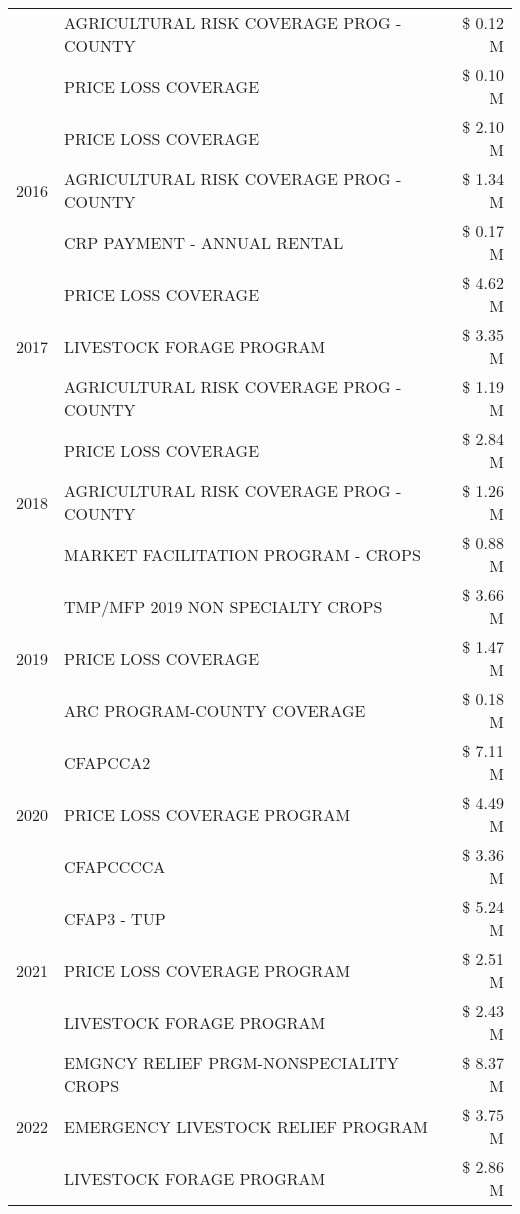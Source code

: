 \begin{tabular}{llr}
 & AGRICULTURAL RISK COVERAGE PROG - COUNTY & \$ 0.12 M \\
 & PRICE LOSS COVERAGE & \$ 0.10 M \\
\cline{1-3}
\multirow[t]{3}{*}{2016} & PRICE LOSS COVERAGE & \$ 2.10 M \\
 & AGRICULTURAL RISK COVERAGE PROG - COUNTY & \$ 1.34 M \\
 & CRP PAYMENT - ANNUAL RENTAL & \$ 0.17 M \\
\cline{1-3}
\multirow[t]{3}{*}{2017} & PRICE LOSS COVERAGE & \$ 4.62 M \\
 & LIVESTOCK FORAGE PROGRAM & \$ 3.35 M \\
 & AGRICULTURAL RISK COVERAGE PROG - COUNTY & \$ 1.19 M \\
\cline{1-3}
\multirow[t]{3}{*}{2018} & PRICE LOSS COVERAGE & \$ 2.84 M \\
 & AGRICULTURAL RISK COVERAGE PROG - COUNTY & \$ 1.26 M \\
 & MARKET FACILITATION PROGRAM - CROPS & \$ 0.88 M \\
\cline{1-3}
\multirow[t]{3}{*}{2019} & TMP/MFP 2019 NON SPECIALTY CROPS & \$ 3.66 M \\
 & PRICE LOSS COVERAGE & \$ 1.47 M \\
 & ARC PROGRAM-COUNTY COVERAGE & \$ 0.18 M \\
\cline{1-3}
\multirow[t]{3}{*}{2020} & CFAPCCA2 & \$ 7.11 M \\
 & PRICE LOSS COVERAGE PROGRAM & \$ 4.49 M \\
 & CFAPCCCCA & \$ 3.36 M \\
\cline{1-3}
\multirow[t]{3}{*}{2021} & CFAP3 - TUP & \$ 5.24 M \\
 & PRICE LOSS COVERAGE PROGRAM & \$ 2.51 M \\
 & LIVESTOCK FORAGE PROGRAM & \$ 2.43 M \\
\cline{1-3}
\multirow[t]{3}{*}{2022} & EMGNCY RELIEF PRGM-NONSPECIALITY CROPS & \$ 8.37 M \\
 & EMERGENCY LIVESTOCK RELIEF PROGRAM & \$ 3.75 M \\
 & LIVESTOCK FORAGE PROGRAM & \$ 2.86 M \\
\cline{1-3}
\bottomrule
\end{tabular}
